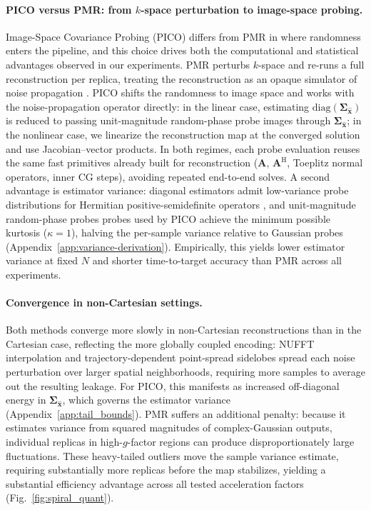 \documentclass[AMA,STIX2COL,Linenumberson]{MRM}
\begin{document}
\paragraph{PICO versus PMR: from $k$-space perturbation to image-space probing.}
Image-Space Covariance Probing (PICO) differs from PMR in where randomness enters the pipeline, and this choice drives both the computational and statistical advantages observed in our experiments. 
PMR perturbs 
$k$-space and re-runs a full reconstruction per replica, 
treating the reconstruction as an opaque simulator of noise 
propagation \cite{pmr,Dawood2024,dalmaz2025efficient}. PICO 
shifts the randomness to image space and works with the 
noise-propagation operator directly: in the linear case, 
estimating $\mathrm{diag}(\boldsymbol{\Sigma}_{\hat{\mathbf{x}}})$ 
is reduced to passing unit-magnitude random-phase probe images through 
$\boldsymbol{\Sigma}_{\hat{\mathbf{x}}}$; in the nonlinear 
case, we linearize the reconstruction map at the converged 
solution and use Jacobian--vector products. In both regimes, 
each probe evaluation reuses the same fast primitives already 
built for reconstruction ($\mathbf{A}$, 
$\mathbf{A}^{\mathrm{H}}$, Toeplitz normal operators, inner 
CG steps), avoiding repeated end-to-end solves. A second 
advantage is estimator variance: diagonal 
estimators admit low-variance probe distributions for 
Hermitian positive-semidefinite operators 
\cite{hutchinson,Avron2011}, and unit-magnitude random-phase probes probes 
used by PICO achieve the minimum possible kurtosis ($\kappa = 1$), 
halving the per-sample variance relative to Gaussian probes 
(Appendix~\ref{app:variance-derivation}). Empirically, this 
yields lower estimator variance at fixed $N$ and shorter 
time-to-target accuracy than PMR across all experiments.

\paragraph{Convergence in non-Cartesian settings.}
Both methods converge more slowly in non-Cartesian 
reconstructions than in the Cartesian case, reflecting the 
more globally coupled encoding: NUFFT interpolation and 
trajectory-dependent point-spread sidelobes spread each 
noise perturbation over larger spatial neighborhoods, 
requiring more samples to average out the resulting leakage. 
For PICO, this manifests as increased 
off-diagonal energy in $\boldsymbol{\Sigma}_{\hat{\mathbf{x}}}$, 
which governs the estimator variance 
(Appendix~\ref{app:tail_bounds}). PMR suffers an additional 
penalty: because it estimates variance from squared magnitudes 
of complex-Gaussian outputs, individual replicas in 
high-$g$-factor regions can produce disproportionately large 
fluctuations. These heavy-tailed outliers move the sample 
variance estimate, requiring substantially more replicas 
before the map stabilizes, yielding a substantial efficiency advantage across all tested acceleration factors (Fig.~\ref{fig:spiral_quant}).
\end{document}
